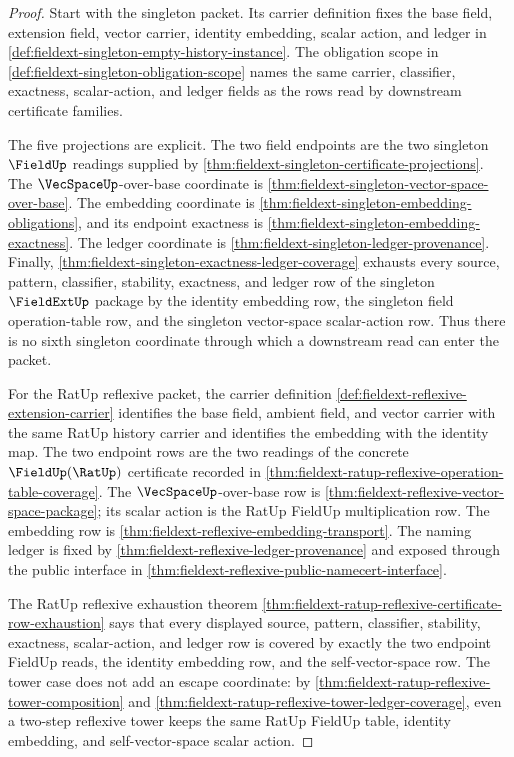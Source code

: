 \begin{proof}
Start with the singleton packet. Its carrier definition fixes the base field,
extension field, vector carrier, identity embedding, scalar action, and ledger
in \autoref{def:fieldext-singleton-empty-history-instance}. The obligation
scope in \autoref{def:fieldext-singleton-obligation-scope} names the same
carrier, classifier, exactness, scalar-action, and ledger fields as the rows
read by downstream certificate families.

The five projections are explicit. The two field endpoints are the two
singleton $\FieldUp$ readings supplied by
\autoref{thm:fieldext-singleton-certificate-projections}. The
$\VecSpaceUp$-over-base coordinate is
\autoref{thm:fieldext-singleton-vector-space-over-base}. The embedding
coordinate is \autoref{thm:fieldext-singleton-embedding-obligations}, and its
endpoint exactness is \autoref{thm:fieldext-singleton-embedding-exactness}.
The ledger coordinate is
\autoref{thm:fieldext-singleton-ledger-provenance}. Finally,
\autoref{thm:fieldext-singleton-exactness-ledger-coverage} exhausts every
source, pattern, classifier, stability, exactness, and ledger row of the
singleton $\FieldExtUp$ package by the identity embedding row, the singleton
field operation-table row, and the singleton vector-space scalar-action row.
Thus there is no sixth singleton coordinate through which a downstream read can
enter the packet.

For the RatUp reflexive packet, the carrier definition
\autoref{def:fieldext-reflexive-extension-carrier} identifies the base field,
ambient field, and vector carrier with the same RatUp history carrier and
identifies the embedding with the identity map. The two endpoint rows are the
two readings of the concrete $\FieldUp(\RatUp)$ certificate recorded in
\autoref{thm:fieldext-ratup-reflexive-operation-table-coverage}. The
$\VecSpaceUp$-over-base row is
\autoref{thm:fieldext-reflexive-vector-space-package}; its scalar action is the
RatUp FieldUp multiplication row. The embedding row is
\autoref{thm:fieldext-reflexive-embedding-transport}. The naming ledger is
fixed by \autoref{thm:fieldext-reflexive-ledger-provenance} and exposed through
the public interface in
\autoref{thm:fieldext-reflexive-public-namecert-interface}.

The RatUp reflexive exhaustion theorem
\autoref{thm:fieldext-ratup-reflexive-certificate-row-exhaustion} says that
every displayed source, pattern, classifier, stability, exactness,
scalar-action, and ledger row is covered by exactly the two endpoint FieldUp
reads, the identity embedding row, and the self-vector-space row. The tower
case does not add an escape coordinate: by
\autoref{thm:fieldext-ratup-reflexive-tower-composition} and
\autoref{thm:fieldext-ratup-reflexive-tower-ledger-coverage}, even a two-step
reflexive tower keeps the same RatUp FieldUp table, identity embedding, and
self-vector-space scalar action.


\end{proof}
